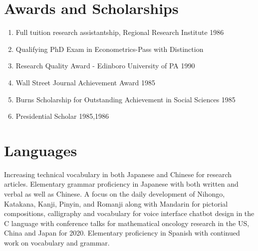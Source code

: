 \documentclass{TMLSStyleGuideResumeVitae}
\begin{document}
\section{Awards and Scholarships}
\begin{enumerate} \itemsep -2pt
\item Full tuition research assistantship, Regional Research Institute 1986  \\
\item Qualifying PhD Exam in Econometrics-Pass with Distinction\\
\item Research Quality Award - Edinboro University of PA 1990\\
\item Wall Street Journal Achievement Award 1985\\
\item Burns Scholarship for Outstanding Achievement in Social Sciences 1985\\
\item Presidential Scholar 1985,1986\\
\end{enumerate}

\section{Languages}
Increasing technical vocabulary in both Japanese and 
Chinese for research articles.
Elementary grammar proficiency in Japanese with both 
written and verbal as well as Chinese.  
A focus on the daily development of Nihongo, Katakana, Kanji, 
Pinyin, and Romanji along with Mandarin for pictorial
compositions, calligraphy and vocabulary for voice 
interface chatbot design in the C language with conference 
talks for mathematical oncology research in the US, China and Japan for 2020.  
Elementary proficiency in Spanish with continued work on vocabulary and grammar.
\end{document}

